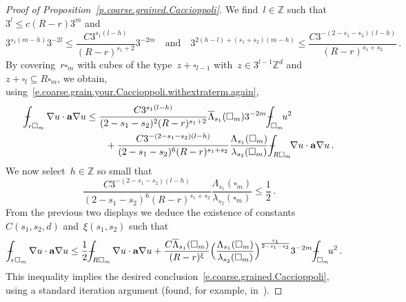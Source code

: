 \documentclass[11pt,twoside]{article} %
\let\oldsquare\square %
\renewcommand{\square}{\oldsquare}
\numberwithin{equation}{section}
\theoremstyle{definition}
\newcommand*{\Z}{\ensuremath{\mathbb{Z}}}
\newcommand*{\Zd}{\ensuremath{\mathbb{Z}^d}}
\newcommand{\qand}{\quad \mbox{and} \quad }
\renewcommand{\a}{\mathbf{a}}
\newcommand{\cu}{\square}
\def\Xint#1{\mathchoice
{\XXint\displaystyle\textstyle{#1}}%
{\XXint\textstyle\scriptstyle{#1}}%
{\XXint\scriptstyle\scriptscriptstyle{#1}}%
{\XXint\scriptscriptstyle\scriptscriptstyle{#1}}%
\!\int}
\def\XXint#1#2#3{{\setbox0=\hbox{$#1{#2#3}{\int}$}
\vcenter{\hbox{$#2#3$}}\kern-.5\wd0}}
\def\fint{\Xint-}
\begin{document}
\begin{proof}[Proof of Proposition~\ref{p.coarse.grained.Caccioppoli}]
We find~$l \in\Z$ such that~$3^l \leq c(R-r) 3^m$ and
\begin{equation*} 
3^{s_1(m-h)} 3^{-2l}
\leq \frac{C3^{s_1(l-h)}}{(R-r)^{s_1+2}} 3^{-2m}
\qand
3^{2(h-l) + (s_1+s_2)(m-h)}
\leq \frac{C3^{-(2-s_1-s_2)(l-h)}}{(R-r)^{s_1+s_2}}  \,.
\end{equation*}
By covering~$r \cu_m$ with cubes of the type~$z+\cu_{l-1}$ with~$z \in 3^{l -1}\Zd$ and~$z+\cu_l \subseteq R\cu_m$, we obtain, using~\eqref{e.coarse.grain.your.Caccioppoli.withextraterm.again}, 
\begin{align*}
\fint_{r \cu_m} 
\nabla u \cdot \a\nabla u
& 
\leq 
\frac{C3^{s_1(l-h)}}{(2 - s_1 - s_2)^{2} (R-r)^{s_1+2}}
\overline{\Lambda}_{s_1}(\cu_m)
3^{-2m}\fint_{\cu_m} \!\! u^2 
\notag \\ & \qquad 
+\frac{C3^{-(2-s_1-s_2)(l-h)}}{(2- s_1 - s_2)^{6} (R-r)^{s_1+s_2}}
\frac{\Lambda_{s_1}(\cu_m)}{\lambda_{s_2}(\cu_m)}
\fint_{R \cu_m} \!\!
\nabla u \cdot \a\nabla u 
\,.
\end{align*}
We now select~$h \in \Z$ so small that
\begin{equation*} 
\frac{C3^{-(2-s_1-s_2)(l-h)}}{(2 -s_1 -s_2)^{6} (R-r)^{s_1+s_2}}
\frac{\Lambda_{s_1}(\cu_m)}{\lambda_{s_2}(\cu_m)} \leq \frac12\,.
\end{equation*}
From the previous two displays we deduce the existence of constants~$C(s_1,s_2,d)$ and~$\xi(s_1,s_2)$ such that
\begin{align*} 
\fint_{r \cu_m} 
\nabla u \cdot \a\nabla u
&
\leq
\frac12
\fint_{R \cu_m} 
\nabla u \cdot \a\nabla u
+ 
\frac{C\overline{\Lambda}_{s_1}(\cu_m)}{(R-r)^{\xi}} \Bigl( \frac{\Lambda_{s_1}(\cu_m)}{\lambda_{s_2}(\cu_m)} \Bigr)^{\frac{s_1}{2-s_1-s_2}}  3^{-2m}\fint_{\cu_m} \!\! u^2 
\,.
\end{align*}
This inequality implies the desired conclusion~\eqref{e.coarse.grained.Caccioppoli}, using a standard iteration argument (found, for example, in~\cite[Lemma C.6]{AKMBook}). 
\end{proof}
\end{document}
